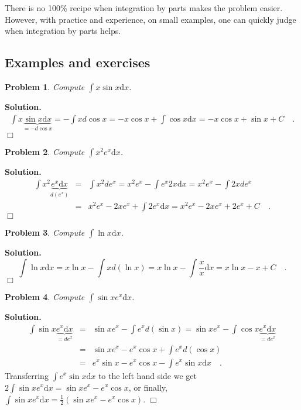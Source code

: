 \documentclass[12pt]{book}
\newcommand{\diff}{\text{d}}
\newenvironment{solution}{\textbf{Solution.} }{$\Box$}
\newtheorem{problem}{Problem}[section]
\begin{document}
There is no 100\% recipe when integration by parts makes the problem easier. However, with practice and experience, on small examples, one can quickly judge when integration by parts helps.
\subsection{Examples and exercises}
\begin{problem}
Compute $\displaystyle \int x \sin x \diff x$.
\end{problem}
\begin{solution}
\[
\begin{array}{rcl}
\displaystyle\int x \underbrace{\sin x \diff x}_{=-d\cos x} = -\int x d\cos x = -x\cos x + \int \cos x \diff x = -x \cos x +\sin x +C\quad .
\end{array}
\]
\end{solution}
\begin{problem}
Compute $\displaystyle \int x^2 e^x \diff x$.
\end{problem}
\begin{solution}
\[
\begin{array}{rcl}
\displaystyle\int x^2 \underbrace{e^x \diff x}_{d (e^x)} &=& \int x^2 d e^x= x^2e^x - \int e^x2x\diff x=  x^2e^x - \int 2xd e^x \\
&=& x^2e^x- 2xe^x+ \int 2e^x \diff x= x^2e^x-2xe^x+2e^x+C\quad .
\end{array}
\]
\end{solution}
\begin{problem}
Compute $\displaystyle \int \ln x \diff x $.
\end{problem}
\begin{solution}
\[
\int \ln x \diff x = x\ln x - \int x d(\ln x)= x\ln x -\int \frac{x}{x}\diff x= x\ln x-x+C\quad . 
\]
\end{solution}
\begin{problem}
Compute $\displaystyle \int \sin x e^x \diff x$.
\end{problem}
\begin{solution}
\[
\begin{array}{rcl}
\displaystyle\int \sin x \underbrace{e^x \diff x}_{=de^x}&=&\displaystyle\sin x e^x - \int e^xd(\sin x)=\sin x e^x - \int \cos x \underbrace{e^x \diff x}_{=de^x}\\
&=& \displaystyle\sin x e^x - e^x\cos x +\int e^x d(\cos x) \\
&=& e^x\sin x -e^x\cos x-\int e^x\sin x \diff x\quad . 
\end{array}
\]
Transferring $\displaystyle\int e^x\sin x \diff x$ to the left hand side we get $\displaystyle 2\int \sin x e^x \diff x = \sin x e^x-e^x\cos x$, or finally, $\displaystyle \int \sin x e^x \diff x=\frac12 \left(\sin x e^x- e^x\cos x\right)$.
\end{solution}
\end{document}
